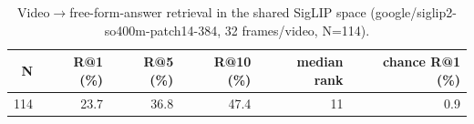 \begin{table}[t]
\centering
\small
\caption{Video$\to$free-form-answer retrieval in the shared SigLIP space (google/siglip2-so400m-patch14-384, 32 frames/video, N=114).}
\label{tab:va_retrieval}
\begin{tabular}{rrrrrr}
\toprule
N & R@1 (\%) & R@5 (\%) & R@10 (\%) & median rank & chance R@1 (\%) \\
\midrule
114 & 23.7 & 36.8 & 47.4 & 11 & 0.9 \\
\bottomrule
\end{tabular}
\end{table}
